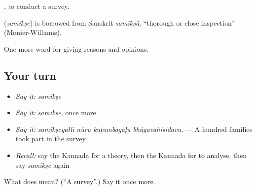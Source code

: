  , to conduct a survey.

\begin{cousinweb}
\textbf{} (\emph{samīkṣe}) is borrowed from Sanskrit \emph{samīkṣā}, \textquotedblleft{}thorough or close inspection\textquotedblright{} (Monier-Williams).
\end{cousinweb}

\begin{grammarlens}[title={What you've built}]
One more word for giving reasons and opinions.
\end{grammarlens}

\subsection*{Your turn}
\begin{itemize}
\raggedright
  \item \emph{Say it:} \emph{samīkṣe}
  \item \emph{Say it:} \emph{samīkṣe}, once more
  \item \emph{Say it:} \emph{samīkṣeyalli nūru kuṭumbagaḷu bhāgavahisidavu.} — A hundred families took part in the survey.
  \item \emph{Recall:} say the Kannada for a theory, then the Kannada for to analyse, then say \emph{samīkṣe} again
\end{itemize}

\begin{tcolorbox}[breakable,colback=teal!4,colframe=teal!35!black,title={Before you move on}]
What does  mean? (\textquotedblleft{}A survey\textquotedblright{}.) Say it once more.
\end{tcolorbox}
